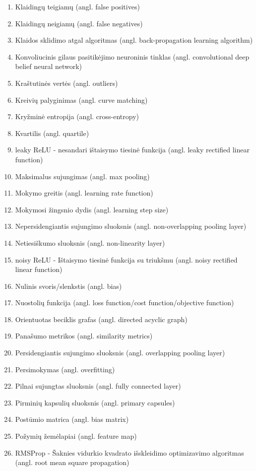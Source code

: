 \begin{enumerate}
	\item Klaidingų teigiamų (angl. false positives)
	\item Klaidingų neigiamų (angl. false negatives)
	\item Klaidos sklidimo atgal algoritmas (angl. back-propagation learning algorithm)
	\item Konvoliucinis gilaus pasitikėjimo neuroninis tinklas (angl. convolutional deep belief neural network)
	\item Kraštutinės vertės (angl. outliers)
	\item Kreivių palyginimas (angl. curve matching)
	\item Kryžminė entropija (angl. cross-entropy)
	\item Kvartilis (angl. quartile)
	\item leaky ReLU - nesandari ištaisymo tiesinė funkcija (angl. leaky rectified linear function)
	\item Maksimalus sujungimas (angl. max pooling)
	\item Mokymo greitis (angl. learning rate function)
	\item Mokymosi žingsnio dydis (angl. learning step size)
	\item Nepersidengiantis sujungimo sluoksnis (angl. non-overlapping pooling layer)
	\item Netiesiškumo sluoksnis (angl. non-linearity layer)
	\item noisy ReLU - Ištaisymo tiesinė funkcija su triukšmu (angl. noisy rectified linear function)
	\item Nulinis svoris/slenkstis (angl. bias)
	\item Nuostolių funkcija (angl. loss function/cost function/objective function)
	\item Orientuotas beciklis grafas (angl. directed acyclic graph)
	\item Panašumo metrikos (angl. similarity metrics)
	\item Persidengiantis sujungimo sluoksnis (angl. overlapping pooling layer)
	\item Persimokymas (angl. overfitting)
	\item Pilnai sujungtas sluoksnis (angl. fully connected layer)
	\item Pirminių kapsulių sluoksnis (angl. primary capsules)
	\item Postūmio matrica (angl. bias matrix)
	\item Požymių žemėlapiai (angl. feature map)
	\item RMSProp - Šaknies vidurkio kvadrato išskleidimo optimizavimo algoritmas (angl. root mean square propagation)

\end{enumerate}
